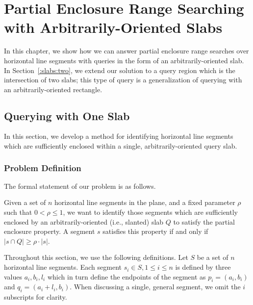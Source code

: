 \chapter{Partial Enclosure Range Searching with Arbitrarily-Oriented Slabs}
\label{:slabs}

In this chapter, we show how we can answer partial enclosure range searches over horizontal line segments with queries in the form of an arbitrarily-oriented slab.
In Section~\ref{:slabs:two}, we extend our solution to a query region which is the intersection of two slabs; this type of query is a generalization of querying with an arbitrarily-oriented rectangle.

\section{Querying with One Slab}
\label{:slabs:one}

In this section, we develop a method for identifying horizontal line segments which are sufficiently enclosed within a single, arbitrarily-oriented query slab.


\subsection{Problem Definition}
\label{:slabs:one:problem-definition}

The formal statement of our problem is as follows.

\begin{problem}
Given a set of $n$ horizontal line segments in the plane, and a fixed parameter $\rho$ such that $0 < \rho \leq 1$, we want to identify those segments which are sufficiently enclosed by an arbitrarily-oriented (i.e., slanted) slab $Q$ to satisfy the partial enclosure property.
A segment $s$ satisfies this property if and only if $|s \cap Q| \geq \rho \cdot |s|$.
\end{problem}

Throughout this section, we use the following definitions. 
Let $S$ be a set of $n$ horizontal line segments.
Each segment $s_i \in S, 1 \leq i \leq n$ is defined by three values $a_i, b_i, l_i$ which in turn define the endpoints of the segment as $p_i = (a_i, b_i)$ and $q_i = (a_i + l_i, b_i)$. 
When discussing a single, general segment, we omit the $i$ subscripts for clarity.

